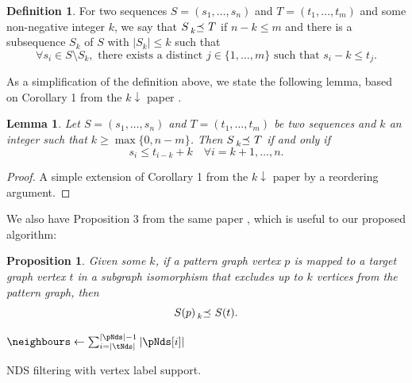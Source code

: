 \documentclass{l4proj}
\newtheorem{lemma}{Lemma}[chapter]
\newtheorem{proposition}{Proposition}[chapter]
\theoremstyle{definition}
\newtheorem{definition}{Definition}[chapter]
\theoremstyle{remark}
\newcommand{\kprec}[1]{\prescript{}{#1}{\preceq}\ }
\begin{document}
\begin{definition} \label{def:prec}
  For two sequences $S = (s_1, \dots, s_n)$ and $T = (t_1, \dots, t_m)$ and some
  non-negative integer $k$, we say that $S \kprec{k} T$ if $n - k \le m$ and
  there is a subsequence $S_k$ of $S$ with $|S_k| \le k$ such that
  \cite{DBLP:conf/aaai/HoffmannMR17}
  \[ \forall s_i \in S \setminus S_k, \text{ there exists a distinct } j \in \{
    1, \dots, m \} \text{ such that } s_i - k \le t_j. \]
\end{definition}
As a simplification of the definition above, we state the following lemma, based
on Corollary 1 from the $k{\downarrow}$ paper \cite{DBLP:conf/aaai/HoffmannMR17}.

\begin{lemma} \label{lemma1}
  Let $S = (s_1, \dots, s_n)$ and $T = (t_1, \dots, t_m)$ be two sequences and
  $k$ an integer such that $k \ge \max\{ 0, n - m \}$. Then $S \kprec{k} T$
  if and only if
  \[ s_i \le t_{i-k} + k \quad \forall i = k + 1, \dots, n. \]
\end{lemma}

\begin{proof}
  A simple extension of Corollary 1 from the $k{\downarrow}$ paper
  \cite{DBLP:conf/aaai/HoffmannMR17} by a reordering argument.
\end{proof}

We also have Proposition 3 from the same paper
\cite{DBLP:conf/aaai/HoffmannMR17}, which is useful to our proposed algorithm:

\begin{proposition} \label{prop:kdown}
  Given some $k$, if a pattern graph vertex $p$ is mapped to a target graph
  vertex $t$ in a subgraph isomorphism that excludes up to $k$ vertices from the
  pattern graph, then
  \[ S(p) \kprec{k} S(t). \]
\end{proposition}

\begin{algorithm}
  $\neighbours \gets \sum_{i=|\tNds|}^{|\pNds| - 1} |\pNds[i]|$\;
  \For{$i \gets 0$ \KwTo $\min\{ |\pNds|, |\tNds| \} - 1$}{
    \If{$|\pNds[i]| - |\tNds[i]| > 0$}{
      $\neighbours \gets \neighbours + |\pNds[i]| - |\tNds[i]|$\;
      \lIf{$\neighbours > k$}{\Return{false}}
    }
    \lIf{$\pNds[i] \cancel{\kprec{k}} \tNds[i]$}{\Return{false}}
  }
  \;
  \caption{NDS filtering with vertex label support.}
  \label{alg:nds}
\end{algorithm}
\end{document}
